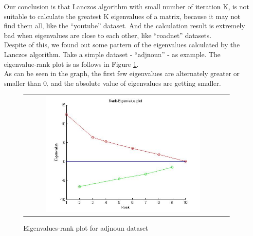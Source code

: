 Our conclusion is that Lanczos algorithm with small number of iteration K, is not suitable to calculate the greatest K eigenvalues of a matrix, because it may not find them all, like the “youtube” dataset. And the calculation result is extremely bad when eigenvalues are close to each other, like “roadnet” datasets. \\
Despite of this, we found out some pattern of the eigenvalues calculated by the Lanczos algorithm. Take a simple dataset - “adjnoun” - as example. The eigenvalue-rank plot is as follows in Figure \ref{fig:results5}. \\
As can be seen in the graph, the first few eigenvalues are alternately greater or smaller than 0, and the absolute value of eigenvalues are getting smaller.

\begin{figure}[htbf]
\begin{center}
\begin{tabular}{cc}
     \includegraphics[width=0.8\textwidth]{FIG/task5.jpg} \\
\end{tabular}
\caption{Eigenvalues-rank plot for adjnoun dataset}
\label{fig:results5}
\end{center}
\end{figure}

